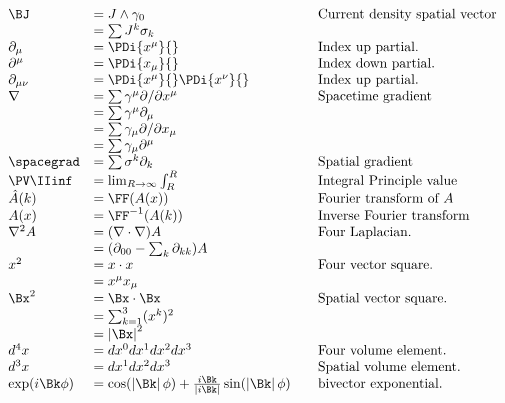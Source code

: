 \begin{equation*}
\begin{array}{l l l}
\BJ &= J \wedge \gamma_0 & \quad \mbox{Current density spatial vector} \\
    &= \sum J^k \sigma_k \\
\partial_{\mu} &= \PDi{x^\mu}{} & \quad \mbox{Index up partial.} \\
\partial^{\mu} &= \PDi{x_\mu}{} & \quad \mbox{Index down partial.} \\
\partial_{\mu\nu} &= \PDi{x^\mu}{}\PDi{x^\nu}{} & \quad \mbox{Index up partial.} \\
\grad &= \sum \gamma^{\mu} \partial/\partial {x^{\mu}} & \quad \mbox{Spacetime gradient} \\
      &= \sum \gamma^{\mu}\partial_{\mu} \\
      &= \sum \gamma_{\mu} \partial/\partial {x_{\mu}} \\
      &= \sum \gamma_{\mu}\partial^{\mu} \\
\spacegrad &= \sum \sigma^{k} \partial_k & \quad \mbox{Spatial gradient} \\
\PV \IIinf &= \lim_{R\rightarrow \infty} \int_{R}^R & \quad \mbox{Integral Principle value} \\
\hat{A}(k) &= \FF(A(x)) & \quad \mbox{Fourier transform of $A$} \\
{A}(x) &= \FF^{-1}(A(k)) & \quad \mbox{Inverse Fourier transform} \\
\grad^2 A
   &= (\grad \cdot \grad) A & \quad \mbox{Four Laplacian. } \\
   &= (\partial_{00} - \sum_k \partial_{kk}) A & \\
x^2 &= x \cdot x & \quad \mbox{Four vector square. } \\
    &= x^\mu x_\mu \\
\Bx^2 &= \Bx \cdot \Bx & \quad \mbox{Spatial vector square. } \\
    &= \sum_{k=1}^3 (x^k)^2 \\
    &= \Abs{\Bx}^2 \\
d^4 x &= dx^0 dx^1 dx^2 dx^3 & \quad \mbox{Four volume element. } \\
d^3 x &= dx^1 dx^2 dx^3 & \quad \mbox{Spatial volume element. } \\
\exp(i\Bk\phi) &=
\cos(\Abs{\Bk}\phi) + \frac{i \Bk}{\Abs{i\Bk}} \sin(\Abs{\Bk}\phi) & \quad \mbox{bivector exponential. } \\
\end{array}
\end{equation*}
